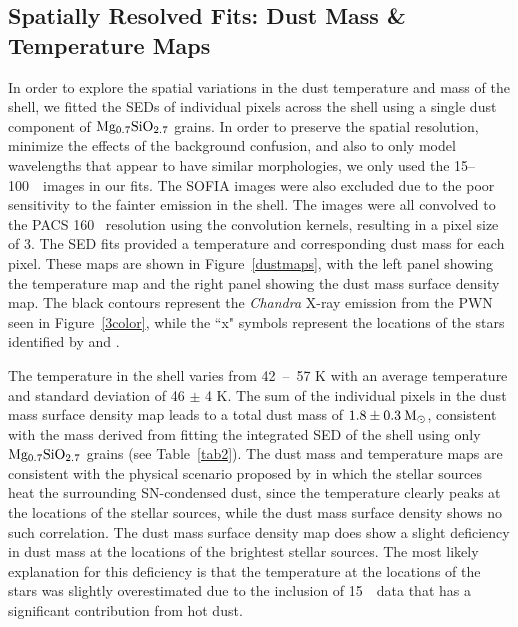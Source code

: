 \documentclass{emulateapj}
\newcommand{\chandra}{\textit{Chandra }}
\begin{document}
\subsection{Spatially Resolved Fits: Dust Mass \& Temperature Maps}\label{maps}


In order to explore the spatial variations in the dust temperature and mass of the shell, we fitted the SEDs of individual pixels across the shell using a single dust component of $\rm Mg_{0.7}SiO_{2.7}$ grains. In order to preserve the spatial resolution, minimize the effects of the background confusion, and also to only model wavelengths that appear to have similar morphologies, we only used the 15--100~\micron\ images in our fits. The SOFIA images were also excluded due to the poor sensitivity to the fainter emission in the shell. The images were all convolved to the PACS 160 \micron\ resolution using the \citet{aniano11} convolution kernels, resulting in a pixel size of 3. The SED fits provided a temperature and corresponding dust mass for each pixel. These maps are shown in Figure~\ref{dustmaps}, with the left panel showing the temperature map and the right panel showing the dust mass surface density map. The black contours represent the \chandra X-ray emission from the PWN seen in Figure~\ref{3color}, while the ``x" symbols represent the locations of the stars identified by \citet{koo08} and \citet{morris10}.

The temperature in the shell varies from 42~--~57 K with an average temperature and standard deviation of 46 $\pm$ 4 K. The sum of the individual pixels in the dust mass surface density map leads to a total dust mass of $\rm 1.8 \pm 0.3 \:M_{\odot}$, consistent with the mass derived from fitting the integrated SED of the shell using only $\rm Mg_{0.7}SiO_{2.7}$ grains (see Table~\ref{tab2}). The dust mass and temperature maps are consistent with the physical scenario proposed by \citet{temim10} in which the stellar sources heat the surrounding SN-condensed dust, since the temperature clearly peaks at the locations of the stellar sources, while the dust mass surface density shows no such correlation. The dust mass surface density map does show a slight deficiency in dust mass at the locations of the brightest stellar sources. The most likely explanation for this deficiency is that the temperature at the locations of the stars was slightly overestimated due to the inclusion of 15~\micron\ data that has a significant contribution from hot dust. 
\end{document}
